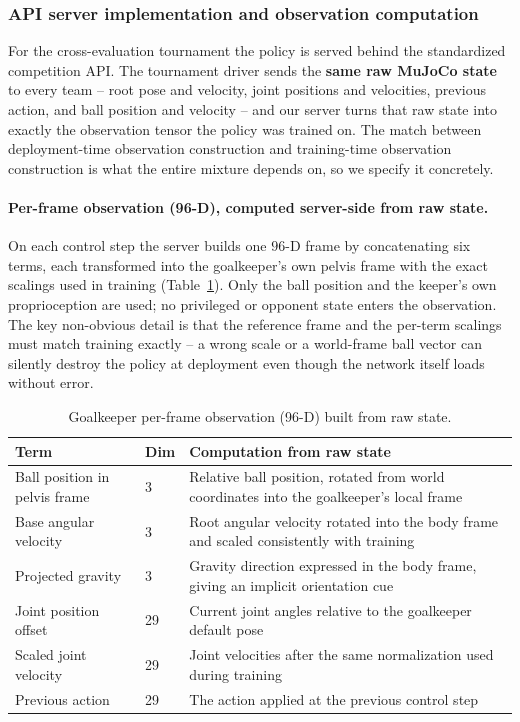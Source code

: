 \documentclass{article}
\begin{document}
\subsubsection{API server implementation and observation computation}\label{sec:gk-api}

For the cross-evaluation tournament the policy is served behind the standardized
competition API. The tournament driver sends the \textbf{same raw MuJoCo state}
to every team -- root pose and velocity, joint positions and velocities,
previous action, and ball position and velocity -- and our server turns that raw
state into exactly the observation tensor the policy was trained on. The match
between deployment-time observation construction and training-time observation
construction is what the entire mixture depends on, so we specify it
concretely.

\paragraph{Per-frame observation (96-D), computed server-side from raw state.}
On each control step the server builds one $96$-D frame by concatenating six
terms, each transformed into the goalkeeper's own pelvis frame with the exact
scalings used in training (Table~\ref{tab:gk-obs}). Only the ball position and
the keeper's own proprioception are used; no privileged or opponent state
enters the observation. The key non-obvious detail is that the reference frame
and the per-term scalings must match training exactly -- a wrong scale or a
world-frame ball vector can silently destroy the policy at deployment even
though the network itself loads without error.

\begin{table}[h]
\centering\small
\caption{Goalkeeper per-frame observation (96-D) built from raw state.}
\label{tab:gk-obs}
\begin{tabular}{@{}llp{8.3cm}@{}}
\toprule
Term & Dim & Computation from raw state \\
\midrule
Ball position in pelvis frame    & 3  & Relative ball position, rotated from world coordinates into the goalkeeper's local frame \\
Base angular velocity      & 3  & Root angular velocity rotated into the body frame and scaled consistently with training \\
Projected gravity & 3  & Gravity direction expressed in the body frame, giving an implicit orientation cue \\
Joint position offset     & 29 & Current joint angles relative to the goalkeeper default pose \\
Scaled joint velocity  & 29 & Joint velocities after the same normalization used during training \\
Previous action       & 29 & The action applied at the previous control step \\
\bottomrule
\end{tabular}
\end{table}
\end{document}
